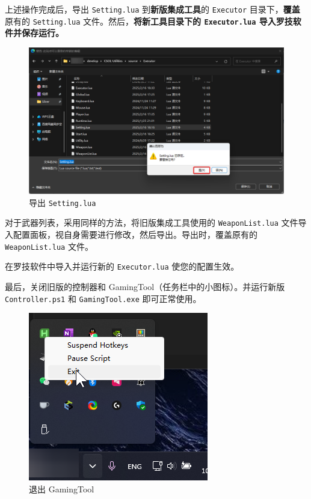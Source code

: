 上述操作完成后，导出 \lstinline{Setting.lua} 到\textbf{\color{red}新版集成工具}的 \lstinline{Executor} 目录下，\textbf{\color{red}覆盖}原有的 \lstinline{Setting.lua} 文件。然后，\textbf{\color{red}将新工具目录下的 \lstinline{Executor.lua} 导入罗技软件并保存运行。}

\begin{figure}[H]
    \Centering
    \includegraphics[width=\textwidth]{assets/override_setting}
    \caption{导出 \lstinline{Setting.lua}}
\end{figure}

对于武器列表，采用同样的方法，将旧版集成工具使用的 \lstinline{WeaponList.lua} 文件导入配置面板，视自身需要进行修改，然后导出。导出时，覆盖原有的 \lstinline{WeaponList.lua} 文件。

在罗技软件中导入并运行新的 \lstinline{Executor.lua} 使您的配置生效。

最后，关闭旧版的控制器和 GamingTool（任务栏中的小图标）。并运行新版 \lstinline{Controller.ps1} 和 \lstinline{GamingTool.exe} 即可正常使用。

\begin{figure}[H]
    \Centering
    \includegraphics[width=\textwidth]{assets/intro/exit_gamingtool}
    \caption{退出 GamingTool}
\end{figure}